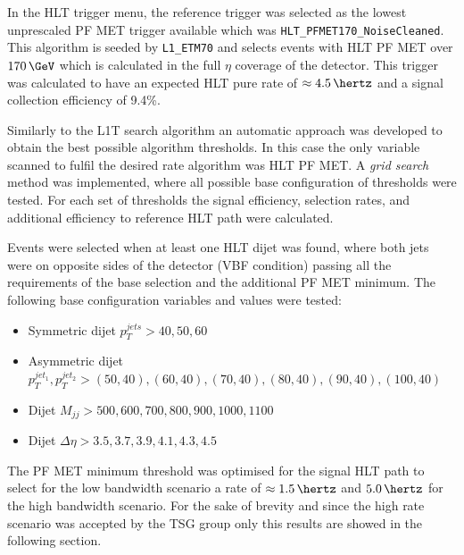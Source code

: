 
In the \gls{HLT} trigger menu, the reference trigger was selected as the lowest unprescaled \gls{PF} \gls{MET} trigger available which was \verb|HLT_PFMET170_NoiseCleaned|. This algorithm is seeded by \verb|L1_ETM70| and selects events with \gls{HLT} \gls{PF} \gls{MET} over $170\,\GeV$ which is calculated in the full $\eta$ coverage of the detector. This trigger was calculated to have an expected \gls{HLT} pure rate of $\approx 4.5\,\hertz$ and a signal collection efficiency of 9.4\%. 

Similarly to the \gls{L1T} search algorithm an automatic approach was developed to obtain the best possible algorithm thresholds. In this case the only variable scanned to fulfil the desired rate algorithm was \gls{HLT} \gls{PF} \gls{MET}. A \textit{grid search} method was implemented, where all possible base configuration of thresholds were tested. For each set of thresholds the signal efficiency, selection rates, and additional efficiency to reference \gls{HLT} path were calculated. 

Events were selected when at least one \gls{HLT} dijet was found, where both jets were on opposite sides of the detector (\gls{VBF} condition) passing all the requirements of the base selection and the additional \gls{PF} \gls{MET} minimum. The following base configuration variables and values were tested:

\begin{itemize}
  \item Symmetric dijet $p_T^{jets}>{40,50,60}$
  \item Asymmetric dijet $p_T^{jet_1},p_T^{jet_2}>{(50,40),(60,40),(70,40),(80,40),(90,40),(100,40)}$
  \item Dijet $M_{jj}>{500,600,700,800,900,1000,1100}$
  \item Dijet $\Delta\eta>{3.5,3.7,3.9,4.1,4.3,4.5}$
\end{itemize}

The \gls{PF} \gls{MET} minimum threshold was optimised for the signal \gls{HLT} path to select for the low bandwidth scenario a rate of $\approx 1.5\,\hertz$ and $5.0\,\hertz$ for the high bandwidth scenario. For the sake of brevity and since the high rate scenario was accepted by the \gls{TSG} group only this results are showed in the following section.


